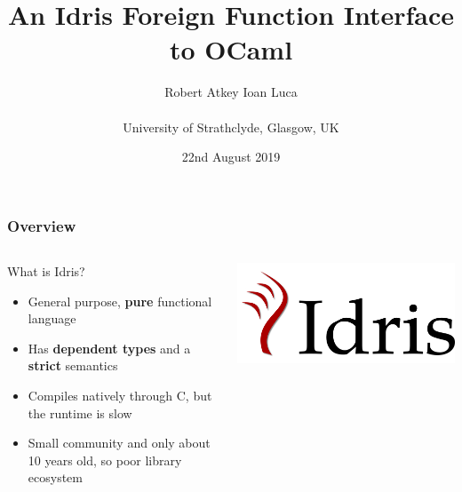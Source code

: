 \documentclass[aspectratio=169]{beamer}
\title{An Idris Foreign Function Interface to OCaml}
\author{Robert Atkey \qquad Ioan Luca\\
  \ \\
  University of Strathclyde, Glasgow, UK}
\date{22nd August 2019}
\begin{document}
\frame{\titlepage}

\newcommand{\youtem}{\quad \textcolor{titlered!80}{---} \quad}

\newcommand{\titlecard}[1]{\begin{frame}%
    \begin{center}%
      \Large \textcolor{titlered}{#1}%
    \end{center}%
  \end{frame}}

\begin{frame}[t]
  \frametitle{Overview}
  \begin{columns}[c]
    \begin{block}{What is Idris?}
      \begin{itemize}
        \item General purpose, \textbf{pure} functional language
        \item Has \textbf{dependent types} and a \textbf{strict} semantics
        \item Compiles natively through C, but the runtime is slow
        \item Small community and only about 10 years old,
              so poor library ecosystem
      \end{itemize}
    \end{block}
    \includegraphics[width=.5\textwidth]{logo.png}
  \end{columns}
\end{frame}
\end{document}
